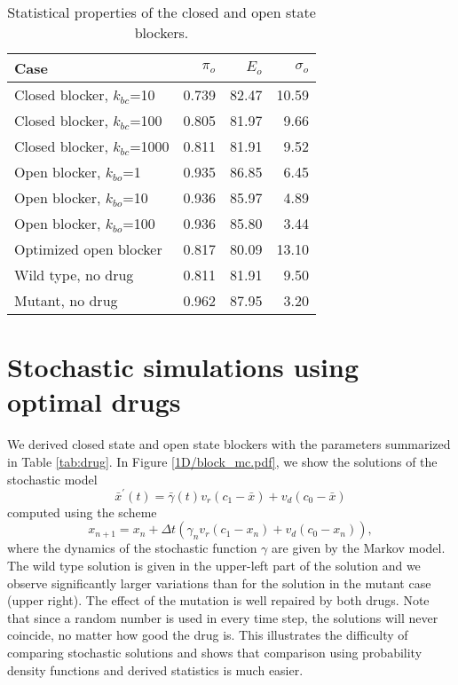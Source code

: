\begin{table}  \begin{center}
\begin{tabular}{|l|r|r|r|} \hline
Case & $\pi_o$ & $E_o$ & $\sigma_o$  \\ \hline
Closed blocker, $k_{bc}$=10 & 0.739 & 82.47 & 10.59  \\ \hline
Closed blocker, $k_{bc}$=100 & 0.805 & 81.97 & 9.66  \\ \hline
Closed blocker, $k_{bc}$=1000 & 0.811 & 81.91 & 9.52 \\ \hline
Open blocker, $k_{bo}$=1 & 0.935 & 86.85 & 6.45  \\ \hline
Open blocker, $k_{bo}$=10 & 0.936 & 85.97 & 4.89  \\ \hline
Open blocker, $k_{bo}$=100 & 0.936 & 85.80 & 3.44  \\ \hline
Optimized open blocker  & 0.817 & 80.09 & 13.10  \\ \hline \hline
Wild type, no drug & 0.811 & 81.91 & 9.50  \\ \hline
Mutant, no drug & 0.962 & 87.95 & 3.20 \\ \hline
\end{tabular} \end{center}
\caption{Statistical properties of the closed and open state blockers. \label{stat_drug}}
\end{table}


\section[Stochastic simulations]{Stochastic simulations using optimal drugs \label{ffgg100}}

We derived closed state and open state blockers with the parameters summarized in Table \ref{tab:drug}. 
In Figure \ref{1D/block_mc.pdf}, we show the solutions of the stochastic model 
\begin{equation}
\bar{x}^{\prime}(t)=\bar{\gamma}(t)v_{r}(c_{1}-\bar{x})+v_{d}(c_{0}-\bar{x})
\label{asde1D1000}%
\end{equation}
 computed 
using the scheme 
\begin{equation}
x_{n+1}=x_{n}+\Delta t\left( \gamma_{n}v_{r}(c_{1}-x_{n})+v_{d}(c_{0}%
-x_{n})\right) \label{sde1D_scheme_200},
\end{equation}
where
 the dynamics of the stochastic function $\gamma$ are given by the Markov model. 
 The wild type solution is given in the upper-left part of the solution and we observe significantly larger 
 variations than for the solution in the mutant case (upper right). 
 The effect of the mutation is well repaired by both drugs. 
 Note that since a random number is used in every time step, the solutions will never coincide, no matter how good the drug is. This illustrates the difficulty of comparing stochastic solutions and shows that comparison using probability density functions and derived statistics is much easier.


